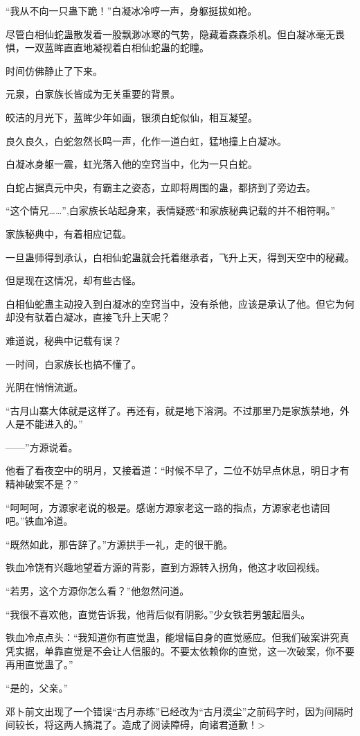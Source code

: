 \begin{this_body}
“我从不向一只蛊下跪！”白凝冰冷哼一声，身躯挺拔如枪。

尽管白相仙蛇蛊散发着一股飘渺冰寒的气势，隐藏着森森杀机。但白凝冰毫无畏惧，一双蓝眸直直地凝视着白相仙蛇蛊的蛇瞳。

时间仿佛静止了下来。

元泉，白家族长皆成为无关重要的背景。

皎洁的月光下，蓝眸少年如画，银须白蛇似仙，相互凝望。

良久良久，白蛇忽然长鸣一声，化作一道白虹，猛地撞上白凝冰。

白凝冰身躯一震，虹光落入他的空窍当中，化为一只白蛇。

白蛇占据真元中央，有霸主之姿态，立即将周围的蛊，都挤到了旁边去。

“这个情兄……”,白家族长站起身来，表情疑惑“和家族秘典记载的并不相符啊。”

家族秘典中，有着相应记载。

一旦蛊师得到承认，白相仙蛇蛊就会托着继承者，飞升上天，得到天空中的秘藏。

但是现在这情况，却有些古怪。

白相仙蛇蛊主动投入到白凝冰的空窍当中，没有杀他，应该是承认了他。但它为何却没有驮着白凝冰，直接飞升上天呢？

难道说，秘典中记载有误？

一时间，白家族长也搞不懂了。

光阴在悄悄流逝。

“古月山寨大体就是这样了。再还有，就是地下溶洞。不过那里乃是家族禁地，外人是不能进入的。”

——”方源说着。

他看了看夜空中的明月，又接着道：“时候不早了，二位不妨早点休息，明日才有精神破案不是？”

“呵呵呵，方源家老说的极是。感谢方源家老这一路的指点，方源家老也请回吧。”铁血冷道。

“既然如此，那告辞了。”方源拱手一礼，走的很干脆。

铁血冷饶有兴趣地望着方源的背影，直到方源转入拐角，他这才收回视线。

“若男，这个方源你怎么看？”他忽然问道。

“我很不喜欢他，直觉告诉我，他背后似有阴影。”少女铁若男皱起眉头。

铁血冷点点头：“我知道你有直觉蛊，能增幅自身的直觉感应。但我们破案讲究真凭实据，单靠直觉是不会让人信服的。不要太依赖你的直觉，这一次破案，你不要再用直觉蛊了。”

“是的，父亲。”

邓卜前文出现了一个错误“古月赤练”已经改为“古月漠尘”之前码字时，因为间隔时间较长，将这两人搞混了。造成了阅读障碍，向诸君道歉！>

\end{this_body}

